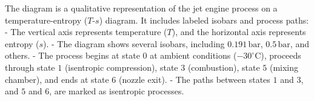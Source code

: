 The diagram is a qualitative representation of the jet engine process on a temperature-entropy (\(T\)-\(s\)) diagram. It includes labeled isobars and process paths:  
- The vertical axis represents temperature (\(T\)), and the horizontal axis represents entropy (\(s\)).  
- The diagram shows several isobars, including \(0.191 \, \text{bar}\), \(0.5 \, \text{bar}\), and others.  
- The process begins at state \(0\) at ambient conditions (\(-30^\circ\text{C}\)), proceeds through state \(1\) (isentropic compression), state \(3\) (combustion), state \(5\) (mixing chamber), and ends at state \(6\) (nozzle exit).  
- The paths between states \(1\) and \(3\), and \(5\) and \(6\), are marked as isentropic processes.